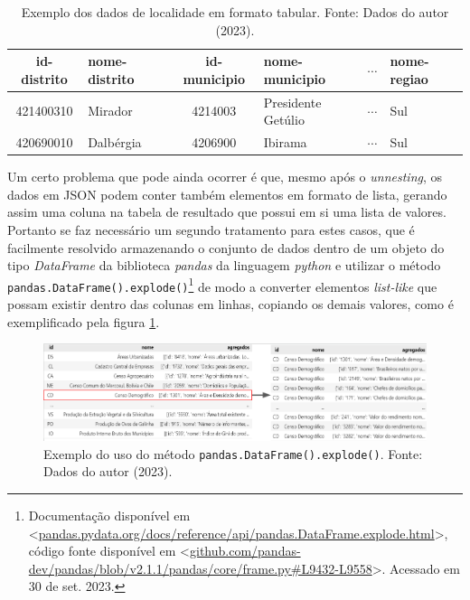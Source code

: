 \begin{center}
    \begin{table}[ht]
        \begin{tabular}{c l c l c l}
            \hline
                id-distrito & nome-distrito & id-municipio & nome-municipio & $\dotsi$ & nome-regiao\\
            \hline
                421400310 & Mirador & 4214003 & Presidente Getúlio & $\dotsi$ & Sul\\
                420690010 & Dalbérgia & 4206900 & Ibirama & $\dotsi$ & Sul\\     
            \hline
        \end{tabular}
        \caption{Exemplo dos dados de localidade em formato tabular. Fonte: Dados do autor (2023).}
        \label{tab:exemplo-api-localidades}
    \end{table}
\end{center}

    Um certo problema que pode ainda ocorrer é que, mesmo após o \textit{unnesting}, os dados em JSON podem conter também elementos em formato de lista, gerando assim uma coluna na tabela de resultado que possui em si uma lista de valores. Portanto se faz necessário um segundo tratamento para estes casos, que é facilmente resolvido armazenando o conjunto de dados dentro de um objeto do tipo \textit{DataFrame} da biblioteca \textit{pandas} da linguagem \textit{python} e utilizar o método \lstinline{pandas.DataFrame().explode()}\footnote{Documentação disponível em <\url{pandas.pydata.org/docs/reference/api/pandas.DataFrame.explode.html}>, código fonte disponível em <\url{github.com/pandas-dev/pandas/blob/v2.1.1/pandas/core/frame.py\#L9432-L9558}>. Acessado em 30 de set. 2023.}     de modo a converter elementos \textit{list-like} que possam existir dentro das colunas em linhas, copiando os demais valores, como é exemplificado pela figura \ref{fig:exploding-df}.

\begin{figure}[ht]
    \centering
    \includegraphics[width=\textwidth]{files/img/exploding_table.png}    \caption{Exemplo do uso do método \lstinline{pandas.DataFrame().explode()}. Fonte: Dados do autor (2023).}
    \label{fig:exploding-df}
\end{figure}

